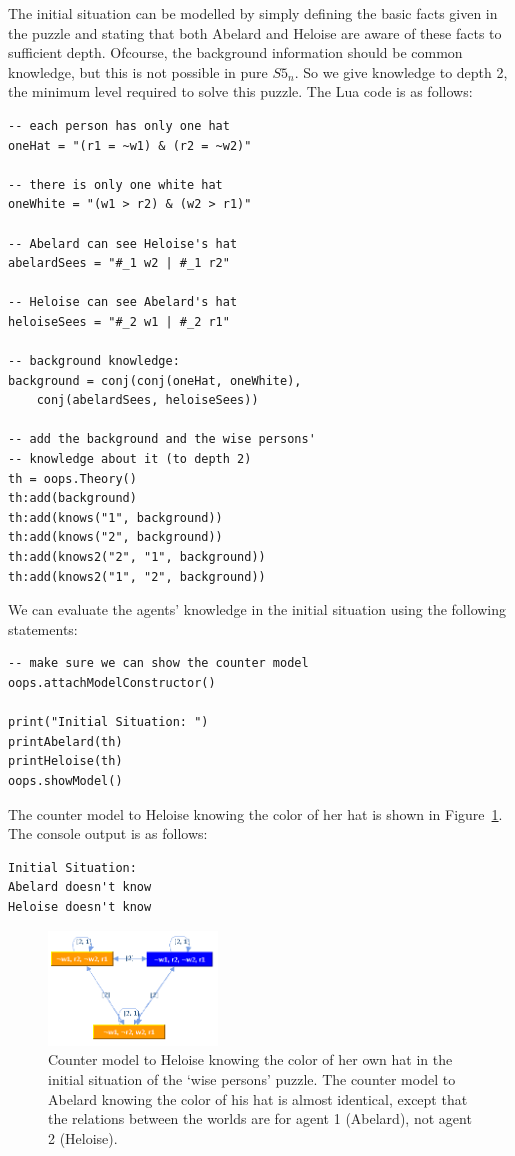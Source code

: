The initial situation can be modelled by simply defining the basic facts given in the puzzle and stating that both Abelard and Heloise are aware of these facts to sufficient depth.
Ofcourse, the background information should be common knowledge, but this is not possible in pure $S5_n$.
So we give knowledge to depth 2, the minimum level required to solve this puzzle.
The Lua code is as follows:
\begin{lstlisting}
-- each person has only one hat
oneHat = "(r1 = ~w1) & (r2 = ~w2)"

-- there is only one white hat
oneWhite = "(w1 > r2) & (w2 > r1)"

-- Abelard can see Heloise's hat
abelardSees = "#_1 w2 | #_1 r2"

-- Heloise can see Abelard's hat
heloiseSees = "#_2 w1 | #_2 r1"

-- background knowledge:
background = conj(conj(oneHat, oneWhite),
    conj(abelardSees, heloiseSees))

-- add the background and the wise persons'
-- knowledge about it (to depth 2)
th = oops.Theory()
th:add(background)
th:add(knows("1", background))
th:add(knows("2", background))
th:add(knows2("2", "1", background))
th:add(knows2("1", "2", background))
\end{lstlisting}
We can evaluate the agents' knowledge in the initial situation using the following statements:
\begin{lstlisting}
-- make sure we can show the counter model
oops.attachModelConstructor()

print("Initial Situation: ")
printAbelard(th)
printHeloise(th)
oops.showModel()
\end{lstlisting}
The counter model to Heloise knowing the color of her hat is shown in Figure~\ref{fig:output1}. The console output is as follows:
\lstset{language=}
\begin{lstlisting}
Initial Situation:
Abelard doesn't know
Heloise doesn't know
\end{lstlisting}
\lstset{language=lua}

\begin{figure}
\centering
\includegraphics[width=0.4\textwidth]{images/demo04}
\caption{Counter model to Heloise knowing the color of her own hat in the initial situation of the `wise persons' puzzle. The counter model to Abelard knowing the color of his hat is almost identical, except that the relations between the worlds are for agent 1 (Abelard), not agent 2 (Heloise).}
\label{fig:output1}
\end{figure}

